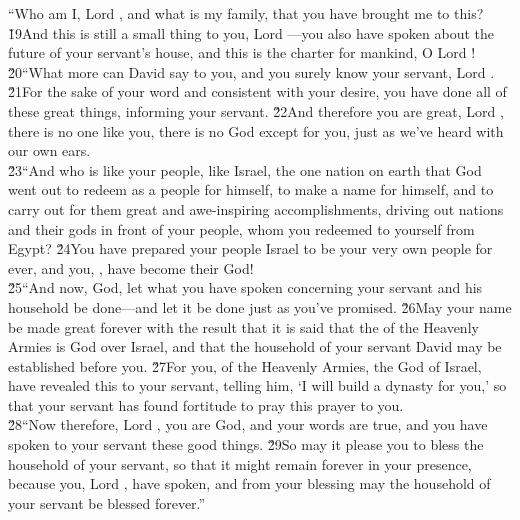 \begin{poetry}
\poeml ``Who am I, Lord , and what is my family, that you have brought me to this? \v{19}And this is still a small thing to you, Lord ---you also have spoken about the future of your servant's house, and this is the charter for mankind, O Lord ! \\
\poeml \v{20}``What more can David say to you, and you surely know your servant, Lord . \v{21}For the sake of your word and consistent with your desire, you have done all of these great things, informing your servant. \v{22}And therefore you are great, Lord , there is no one like you, there is no God except for you, just as we've heard with our own ears. \\
\poeml \v{23}``And who is like your people, like Israel, the one nation on earth that God went out to redeem as a people for himself, to make a name for himself, and to carry out for them great and awe-inspiring accomplishments, driving out nations and their gods in front of your people, whom you redeemed to yourself from Egypt? \v{24}You have prepared your people Israel to be your very own people for ever, and you, , have become their God! \\
\poeml \v{25}``And now,  God, let what you have spoken concerning your servant and his household be done---and let it be done just as you've promised. \v{26}May your name be made great forever with the result that it is said that the  of the Heavenly Armies is God over Israel, and that the household of your servant David may be established before you. \v{27}For you,  of the Heavenly Armies, the God of Israel, have revealed this to your servant, telling him, `I will build a dynasty for you,' so that your servant has found fortitude to pray this prayer to you. \\
\poeml \v{28}``Now therefore, Lord , you are God, and your words are true, and you have spoken to your servant these good things. \v{29}So may it please you to bless the household of your servant, so that it might remain forever in your presence, because you, Lord , have spoken, and from your blessing may the household of your servant be blessed forever.''
\end{poetry}

